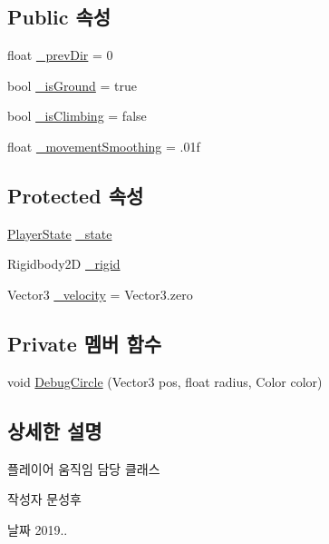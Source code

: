 \subsection*{Public 속성}
\begin{DoxyCompactItemize}
\item 
float \mbox{\hyperlink{class_player_movement_a802b794d028125d4e547a9caeb90d3d4}{\+\_\+prev\+Dir}} = 0
\item 
bool \mbox{\hyperlink{class_player_movement_a3096725f76488ebfdc761c53e9fac852}{\+\_\+is\+Ground}} = true
\item 
bool \mbox{\hyperlink{class_player_movement_af8ea9d72a49e01aecdf8cfd6d2b0b3cf}{\+\_\+is\+Climbing}} = false
\item 
float \mbox{\hyperlink{class_movement_aff7ca49ff5d930ac7345da97a5162e3a}{\+\_\+movement\+Smoothing}} = .\+01f
\end{DoxyCompactItemize}
\subsection*{Protected 속성}
\begin{DoxyCompactItemize}
\item 
\mbox{\hyperlink{class_player_state}{Player\+State}} \mbox{\hyperlink{class_player_movement_af88a64a22da9ba3a831b0fe31bd8e7db}{\+\_\+state}}
\item 
Rigidbody2D \mbox{\hyperlink{class_movement_a8b24a93b5f529e53c668ff81bde13c0d}{\+\_\+rigid}}
\item 
Vector3 \mbox{\hyperlink{class_movement_a6ea6768262f1dca968be8ee5c14a0cc1}{\+\_\+velocity}} = Vector3.\+zero
\end{DoxyCompactItemize}
\subsection*{Private 멤버 함수}
\begin{DoxyCompactItemize}
\item 
void \mbox{\hyperlink{class_player_movement_a6f77ea4796901d5e2a476e2f8ec49b51}{Debug\+Circle}} (Vector3 pos, float radius, Color color)
\end{DoxyCompactItemize}


\subsection{상세한 설명}
플레이어 움직임 담당 클래스 

\begin{DoxyAuthor}{작성자}
문성후 
\end{DoxyAuthor}
\begin{DoxyDate}{날짜}
2019.. 
\end{DoxyDate}


